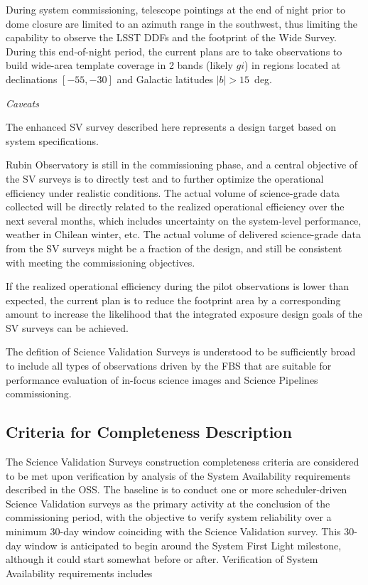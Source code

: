 During system commissioning, telescope pointings at the end of night prior to dome closure are limited to an azimuth range in the southwest, thus limiting the capability to observe the LSST DDFs and the footprint of the Wide Survey.
During this end-of-night period, the current plans are to take observations to build wide-area template coverage in 2 bands (likely $gi$) in regions located at declinations $[-55, -30]$ and Galactic latitudes $|b| > 15$~deg.

\textit{Caveats}

The enhanced SV survey described here represents a design target based on system specifications.

Rubin Observatory is still in the commissioning phase, and a central objective of the SV surveys is to directly test and to further optimize the operational efficiency under realistic conditions.
The actual volume of science-grade data collected will be directly related to the realized operational efficiency over the next several months, which includes uncertainty on the system-level performance, weather in Chilean winter, etc.
The actual volume of delivered science-grade data from the SV surveys might be a fraction of the design, and still be consistent with meeting the commissioning objectives.

If the realized operational efficiency during the pilot observations is lower than expected, the current plan is to reduce the footprint area by a corresponding amount to increase the likelihood that the integrated exposure design goals of the SV surveys can be achieved.

The defition of Science Validation Surveys is understood to be sufficiently broad to include all types of observations driven by the FBS that are suitable for performance evaluation of in-focus science images and Science Pipelines commissioning.

\subsection{Criteria for Completeness Description}

The Science Validation Surveys construction completeness criteria are considered to be met upon verification by analysis of the System Availability requirements described in the OSS.
The baseline is to conduct one or more scheduler-driven Science Validation surveys as the primary activity at the conclusion of the commissioning period, with the objective to verify system reliability over a minimum 30-day window coinciding with the Science Validation survey. This 30-day window is anticipated to begin around the System First Light milestone, although it could start somewhat before or after.
Verification of System Availability requirements includes

